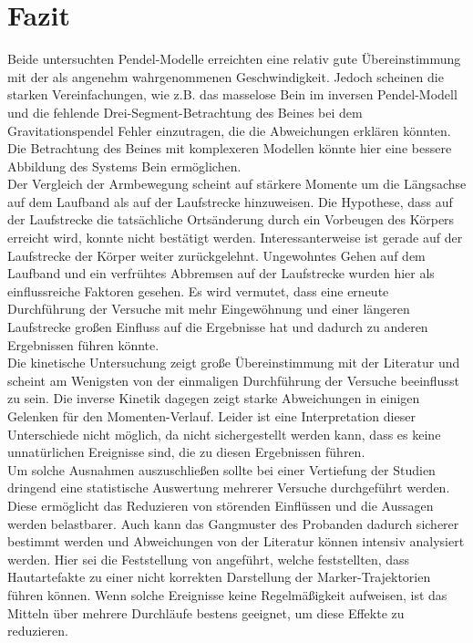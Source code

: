 \section{Fazit}
Beide untersuchten Pendel-Modelle erreichten eine relativ gute Übereinstimmung mit der als angenehm wahrgenommenen Geschwindigkeit. Jedoch scheinen die starken Vereinfachungen, wie z.B. das masselose Bein im inversen Pendel-Modell und die fehlende Drei-Segment-Betrachtung des Beines bei dem Gravitationspendel Fehler einzutragen, die die Abweichungen erklären könnten. Die Betrachtung des Beines mit komplexeren Modellen könnte hier eine bessere Abbildung des Systems Bein ermöglichen.\\
Der Vergleich der Armbewegung scheint auf stärkere Momente um die Längsachse auf dem Laufband als auf der Laufstrecke hinzuweisen. Die Hypothese, dass auf der Laufstrecke die tatsächliche Ortsänderung durch ein Vorbeugen des Körpers erreicht wird, konnte nicht bestätigt werden. Interessanterweise ist gerade auf der Laufstrecke der Körper weiter zurückgelehnt. Ungewohntes Gehen auf dem Laufband und ein verfrühtes Abbremsen auf der Laufstrecke wurden hier als einflussreiche Faktoren gesehen. Es wird vermutet, dass eine erneute Durchführung der Versuche mit mehr Eingewöhnung und einer längeren Laufstrecke großen Einfluss auf die Ergebnisse hat und dadurch zu anderen Ergebnissen führen könnte.\\
Die kinetische Untersuchung zeigt große Übereinstimmung mit der Literatur und scheint am Wenigsten von der einmaligen Durchführung der Versuche beeinflusst zu sein. Die inverse Kinetik dagegen zeigt starke Abweichungen in einigen Gelenken für den Momenten-Verlauf. Leider ist eine Interpretation dieser Unterschiede nicht möglich, da nicht sichergestellt werden kann, dass es keine unnatürlichen Ereignisse sind, die zu diesen Ergebnissen führen.\\
Um solche Ausnahmen auszuschließen sollte bei einer Vertiefung der Studien dringend eine statistische Auswertung mehrerer Versuche durchgeführt werden. Diese ermöglicht das Reduzieren von störenden Einflüssen und die Aussagen werden belastbarer. Auch kann das Gangmuster des Probanden dadurch sicherer bestimmt werden und Abweichungen von der Literatur können intensiv analysiert werden. Hier sei die Feststellung von \textcite{groote2008kalman} angeführt, welche feststellten, dass Hautartefakte zu einer nicht korrekten Darstellung der Marker-Trajektorien führen können. Wenn solche Ereignisse keine Regelmäßigkeit aufweisen, ist das Mitteln über mehrere Durchläufe bestens geeignet, um diese Effekte zu reduzieren.

